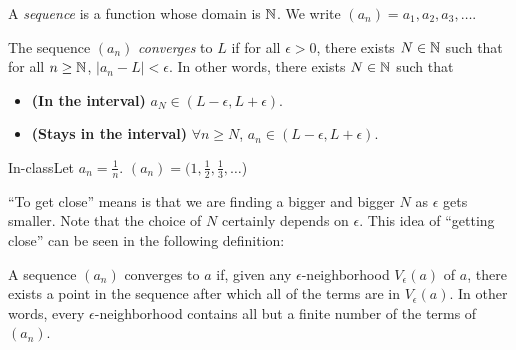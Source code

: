 \begin{definition}
    A \textit{sequence} is a function whose domain is \(\mathbb{N}\). We write \((a_n) = a_1,a_2,a_3,\dots\).
\end{definition}
\setcounter{BoxCounter}{2}
\begin{definition}
    The sequence \((a_n)\) \textit{converges} to \(L\) if for all \(\epsilon > 0\), there exists \(N \in \mathbb{N}\) such that for all \(n \geq \mathbb{N}\), \(|a_n - L| < \epsilon\). In other words, there exists \(N \in \mathbb{N}\) such that
    \begin{itemize}
        \item \textbf{(In the interval)} \(a_N \in (L - \epsilon, L + \epsilon)\).
        \item \textbf{(Stays in the interval)} \(\forall n \geq N\), \(a_n \in (L - \epsilon, L + \epsilon)\).
    \end{itemize}
\end{definition}

\begin{example}
    {In-class}Let \(a_n = \frac{1}{n}\). \((a_n) = (1,\frac{1}{2},\frac{1}{3},\dots\))
\end{example}


``To get close'' means is that we are finding a bigger and bigger \(N\) as \(\epsilon\) gets smaller. Note that the choice of \(N\) certainly depends on \(\epsilon\). This idea of ``getting close'' can be seen in the following definition:

\begin{tcolorbox}%
    [rounded corners, colframe=xred, colback=xred!15, coltitle=white, label=def:2.2.3B, title={\large \textbf{Definition 2.2.3B}}]
    A sequence \( (a_n) \) converges to \( a \) if, given any \( \epsilon \)-neighborhood \( V_\epsilon(a) \) of \( a \), there exists a point in the sequence after which all of the terms are in \( V_\epsilon(a) \). In other words, every \( \epsilon \)-neighborhood contains all but a finite number of the terms of \( (a_n) \).
\end{tcolorbox}

